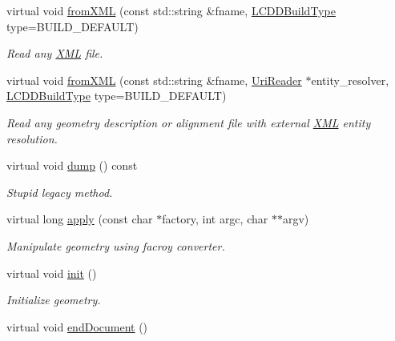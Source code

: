 \begin{DoxyCompactItemize}
virtual void \hyperlink{class_d_d4hep_1_1_geometry_1_1_l_c_d_d_imp_a23921e95e2ba300135d635e58ecb0c51}{fromXML} (const std::string \&fname, \hyperlink{namespace_d_d4hep_acafe43ba4537ab6e999e808142965fab}{LCDDBuildType} type=BUILD\_\-DEFAULT)
\begin{DoxyCompactList}\small\item\em Read any \hyperlink{namespace_d_d4hep_1_1_x_m_l}{XML} file. \item\end{DoxyCompactList}\item 
virtual void \hyperlink{class_d_d4hep_1_1_geometry_1_1_l_c_d_d_imp_ae1c435032cd33235cd6405ca8d8aae9b}{fromXML} (const std::string \&fname, \hyperlink{class_d_d4hep_1_1_x_m_l_1_1_uri_reader}{UriReader} $\ast$entity\_\-resolver, \hyperlink{namespace_d_d4hep_acafe43ba4537ab6e999e808142965fab}{LCDDBuildType} type=BUILD\_\-DEFAULT)
\begin{DoxyCompactList}\small\item\em Read any geometry description or alignment file with external \hyperlink{namespace_d_d4hep_1_1_x_m_l}{XML} entity resolution. \item\end{DoxyCompactList}\item 
virtual void \hyperlink{class_d_d4hep_1_1_geometry_1_1_l_c_d_d_imp_ad50f1540a6b3d99e049e1e4a91eabf8a}{dump} () const 
\begin{DoxyCompactList}\small\item\em Stupid legacy method. \item\end{DoxyCompactList}\item 
virtual long \hyperlink{class_d_d4hep_1_1_geometry_1_1_l_c_d_d_imp_a3dfdf0180fa0a61067bd1f12fa15ecd6}{apply} (const char $\ast$factory, int argc, char $\ast$$\ast$argv)
\begin{DoxyCompactList}\small\item\em Manipulate geometry using facroy converter. \item\end{DoxyCompactList}\item 
virtual void \hyperlink{class_d_d4hep_1_1_geometry_1_1_l_c_d_d_imp_af0cf7ab83180ee15085bcc7e1383f561}{init} ()
\begin{DoxyCompactList}\small\item\em Initialize geometry. \item\end{DoxyCompactList}\item 
virtual void \hyperlink{class_d_d4hep_1_1_geometry_1_1_l_c_d_d_imp_aa3fa37aa7608b67f95aa644dc381389f}{endDocument} ()
$$
\end{DoxyCompactItemize}
